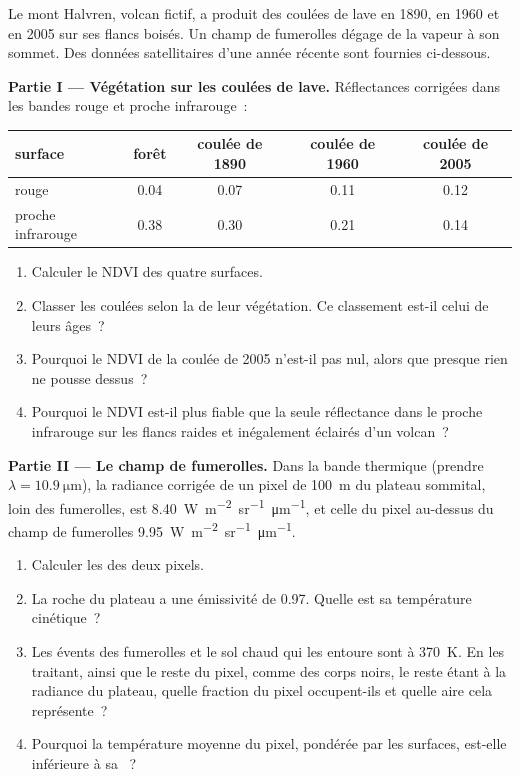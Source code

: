 \begin{problem}
\label{pb:b3:remote-sensing-gis:1}
Le mont Halvren, volcan fictif, a produit des coulées de lave en 1890, en 1960
et en 2005 sur ses flancs boisés. Un champ de fumerolles dégage de la vapeur à son sommet.
Des données satellitaires d'une année récente sont fournies ci-dessous.

\medskip\noindent\textbf{Partie I --- Végétation sur les coulées de lave.} Réflectances corrigées
dans les bandes rouge et proche infrarouge~:
\begin{center}
\small
\begin{tabular}{lcccc}
\hline
surface & forêt & coulée de 1890 & coulée de 1960 & coulée de 2005 \\
\hline
rouge & 0.04 & 0.07 & 0.11 & 0.12 \\
proche infrarouge & 0.38 & 0.30 & 0.21 & 0.14 \\
\hline
\end{tabular}
\end{center}
\begin{enumerate}
\item Calculer le NDVI des quatre surfaces.
\item Classer les coulées selon la  de leur végétation. Ce classement est-il
  celui de leurs âges~?
\item Pourquoi le NDVI de la coulée de 2005 n'est-il pas nul, alors que presque
  rien ne pousse dessus~?
\item Pourquoi le NDVI est-il plus fiable que la seule réflectance dans le proche infrarouge
  sur les flancs raides et inégalement éclairés d'un volcan~?
\end{enumerate}

\medskip\noindent\textbf{Partie II --- Le champ de fumerolles.} Dans la bande
thermique (prendre $\lambda = \qty{10.9}{\micro\metre}$), la radiance corrigée de
un pixel de \qty{100}{m} du plateau sommital, loin des fumerolles, est
\qty{8.40}{W.m^{-2}.sr^{-1}.\micro\metre^{-1}}, et celle du pixel au-dessus
du champ de fumerolles \qty{9.95}{W.m^{-2}.sr^{-1}.\micro\metre^{-1}}.
\begin{enumerate}[resume]
\item Calculer les  des deux pixels.
\item La roche du plateau a une émissivité de 0.97. Quelle est sa température
  cinétique~?
\item Les évents des fumerolles et le sol chaud qui les entoure sont à
  \qty{370}{K}. En les traitant, ainsi que le reste du pixel, comme des corps noirs,
  le reste étant à la radiance du plateau, quelle fraction du pixel occupent-ils
  et quelle aire cela représente~?
\item Pourquoi la température moyenne du pixel, pondérée par les surfaces, est-elle inférieure
  à sa ~?
\end{enumerate}


\end{problem}

